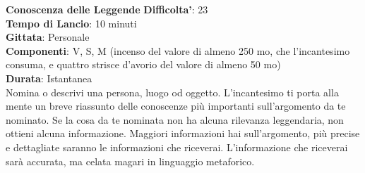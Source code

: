 \begin{multicols}{2}
\medskip\textbf{Conoscenza delle Leggende}
\textbf{Difficolta'}: 23\\
\textbf{Tempo di Lancio}: 10 minuti\\
\textbf{Gittata}: Personale\\
\textbf{Componenti}: V, S, M (incenso del valore di almeno 250 mo, che l’incantesimo consuma, e quattro strisce d’avorio del valore di almeno 50 mo)\\
\textbf{Durata}: Istantanea\\
Nomina o descrivi una persona, luogo od oggetto. L’incantesimo ti porta alla mente un breve riassunto delle conoscenze più importanti sull’argomento da te nominato. Se la cosa da te nominata non ha alcuna rilevanza leggendaria, non ottieni alcuna informazione. Maggiori informazioni hai sull’argomento, più precise e dettagliate saranno le informazioni che riceverai. L’informazione che riceverai sarà accurata, ma celata magari in linguaggio metaforico.


\end{multicols}
